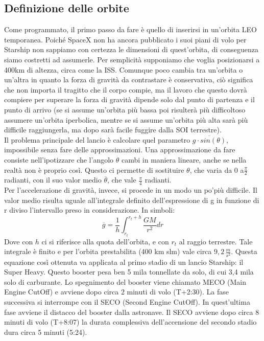 \subsection{Definizione delle orbite}
\label{Definizione orbite}
Come programmato, il primo passo da fare è quello di inserirsi in un'orbita LEO temporanea. Poiché SpaceX non ha ancora pubblicato i suoi piani di volo per Starship non sappiamo con certezza le dimensioni di quest'orbita, di conseguenza siamo costretti ad assumerle. Per semplicità supponiamo che voglia posizionarsi a 400km di altezza, circa come la ISS. Comunque poco cambia tra un'orbita o un'altra in quanto la forza di gravità da contrastare è conservativa, ciò significa che non importa il tragitto che il corpo compie, ma il lavoro che questo dovrà compiere per superare la forza di gravità dipende solo dal punto di partenza e il punto di arrivo (se si assume  un'orbita più bassa poi risulterà più difficoltoso assumere un'orbita iperbolica, mentre se si assume un'orbita più alta sarà più difficile raggiungerla, ma dopo sarà facile fuggire dalla SOI terrestre).\\
Il problema principale del lancio è calcolare quel parametro $\overline{g \cdot sin(\theta)}$, impossibile senza fare delle approssimazioni. Una approssimazione da fare consiste nell'ipotizzare che l'angolo $\theta$ cambi in maniera lineare, anche se nella realtà non è proprio così. Questo ci permette di sostituire $\theta$, che varia da 0 a$\frac{\pi}{2}$ radianti, con il suo valor medio $\overline{\theta}$, che vale $\frac{\pi}{4}$ radianti. \\
Per l'accelerazione di gravità, invece, si procede in un modo un po'più difficile. Il valor medio risulta uguale all'integrale definito dell'espressione di g in funzione di r diviso l'intervallo preso in considerazione. In simboli:
$$
\overline{g} = \frac{1}{h}\int_{r_t}^{r_t+h}{\frac{GM}{r^2}dr}
$$
Dove con $h$ ci si riferisce alla quota dell'orbita, e con $r_t$ al raggio terrestre. Tale integrale è finito e per l'orbita prestabilita (400 km slm) vale circa $9,2 \, \frac{m}{s^2}$.
Questa equazione così ottenuta va applicata al primo stadio di un lancio Starship: il Super Heavy. Questo booster pesa ben 5 mila tonnellate da solo, di cui 3,4 mila solo di carburante. Lo spegnimento del booster viene chiamato MECO (Main Engine CutOff) e avviene dopo circa 2 minuti di volo (T+2:30). La fase successiva si interrompe con il SECO (Second Engine CutOff). In quest'ultima fase avviene il distacco del booster dalla astronave. Il SECO avviene dopo circa 8 minuti di volo (T+8:07) la durata complessiva dell'accensione del secondo stadio dura circa 5 minuti (5:24).
